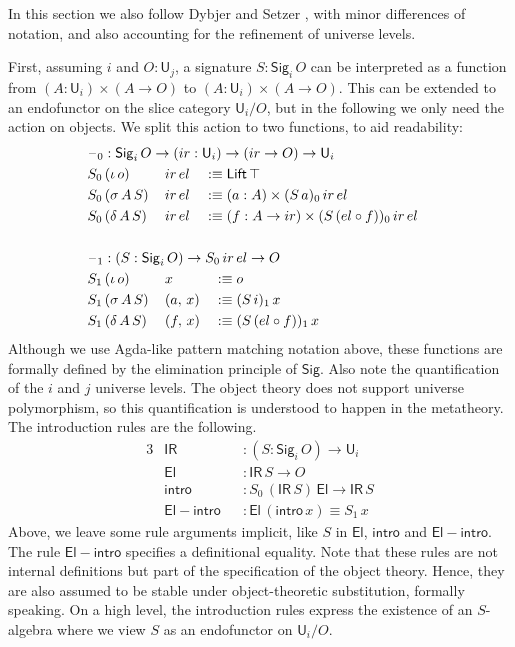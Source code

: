\documentclass[acmsmall,screen,review,anonymous]{acmart}
\newcommand{\msf}[1]{{\mathsf{#1}}}
\newcommand{\U}{\msf{U}}
\newcommand{\El}{\msf{El}}
\newcommand{\Lift}{\msf{Lift}}
\newcommand{\Sig}{\msf{Sig}}
\newcommand{\blank}{{\mathord{\hspace{1pt}\text{--}\hspace{1pt}}}}
\newcommand{\ir}{{ir}}
\newcommand{\el}{{el}}
\newcommand{\IR}{\msf{IR}}
\newcommand{\intro}{\msf{intro}}
\begin{document}
In this section we also follow Dybjer and Setzer \cite{TODO}, with minor differences of notation, and
also accounting for the refinement of universe levels.

First, assuming $i$ and $O : \U_j$, a signature $S : \Sig_i\,O$ can be interpreted as a function
from $(A : \U_i) \times (A \to O)$ to $(A : \U_i) \times (A \to O)$. This can be extended to an
endofunctor on the slice category $\U_i/O$, but in the following we only need the action on
objects. We split this action to two functions, to aid readability:
\begin{alignat*}{3}
  &\rlap{$\blank_0 : \Sig_i\,O \to (\ir : \U_i) \to (\ir \to O) \to \U_i$} \\
  &S_0\,(\iota\,o)    \,&&\ir\,\el && \hspace{-0.7em}:\equiv \Lift\,\top\\
  &S_0\,(\sigma\,A\,S)\,&&\ir\,\el && \hspace{-0.7em}:\equiv (a : A) \times (S\,a)_0\,\ir\,\el\\
  &S_0\,(\delta\,A\,S)\,&&\ir\,\el && \hspace{-0.7em}:\equiv (f : A \to \ir) \times (S\,(\el \circ f))_0\,\ir\,\el\\
  & && &&\\
  &\rlap{$\blank_1 : (S : \Sig_i\,O) \to S_0\,\ir\,\el \to O$} \\
  &S_1\,(\iota\,o)    \,&&x       && :\equiv o\\
  &S_1\,(\sigma\,A\,S)\,&&(a,\,x) && :\equiv (S\,i)_1\,x\\
  &S_1\,(\delta\,A\,S)\,&&(f,\,x) && :\equiv (S\,(\el \circ f))_1\,x
\end{alignat*}
Although we use Agda-like pattern matching notation above, these functions are formally defined by
the elimination principle of $\Sig$. Also note the quantification of the $i$ and $j$ universe
levels. The object theory does not support universe polymorphism, so this quantification is
understood to happen in the metatheory. The introduction rules are the following.
\begin{alignat*}{3}
  &\IR                && : (S : \Sig_i\,O) \to \U_i\\
  &\El                && : \IR\,S \to O\\
  &\intro             && : S_0\,(\IR\,S)\,\El \to \IR\,S\\
  &\msf{El\!\!-\!\!intro} && : \El\,(\intro\,x) \equiv S_1\,x
\end{alignat*}
Above, we leave some rule arguments implicit, like $S$ in $\El$, $\intro$ and
$\msf{El\!\!-\!\!intro}$. The rule $\msf{El\!\!-\!\!intro}$ specifies a definitional equality.  Note
that these rules are not internal definitions but part of the specification of the object
theory. Hence, they are also assumed to be stable under object-theoretic substitution, formally
speaking. On a high level, the introduction rules express the existence of an $S$-algebra where we
view $S$ as an endofunctor on $\U_i/O$.
\end{document}
